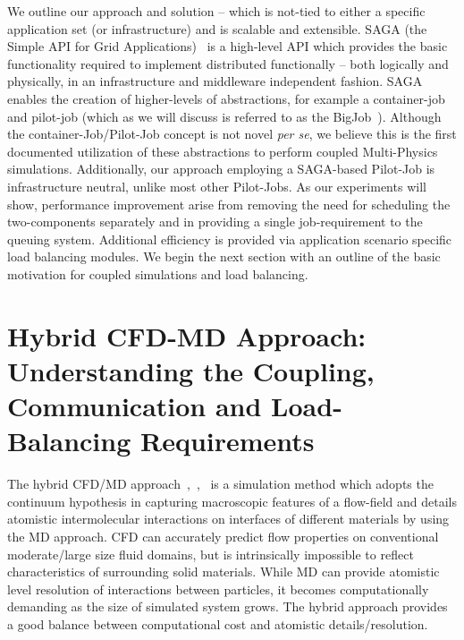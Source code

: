 \documentclass[conference,final]{IEEEtran}
\begin{document}
We outline our approach and solution -- which is not-tied to either a specific application set (or infrastructure) and is scalable and extensible. SAGA (the Simple API for Grid Applications)~\cite{saga_web} is a high-level API which provides the basic functionality required to implement distributed functionally -- both logically and physically, in an infrastructure and middleware independent fashion.  SAGA enables the creation of higher-levels of abstractions, for example a container-job and pilot-job (which as we will discuss is referred to as the BigJob~\cite{saga_royalsoc}). %
Although the container-Job/Pilot-Job concept is not novel {\it per se}, we believe this is the first documented utilization of these abstractions to perform coupled Multi-Physics simulations. Additionally, our approach employing a SAGA-based Pilot-Job is infrastructure neutral, unlike most other Pilot-Jobs.  As our experiments will show, performance improvement %
arise from removing the need for scheduling the two-components separately and in providing a single job-requirement to the queuing system. Additional efficiency is provided via application scenario specific load balancing modules.  We begin the next section with an outline of the basic motivation for coupled simulations and load balancing.


\section{Hybrid CFD-MD Approach: Understanding the Coupling, Communication and Load-Balancing Requirements}

The hybrid CFD/MD approach~\cite{Thompson},~\cite{Nie},~\cite{Yen} is a simulation method which adopts the continuum hypothesis in capturing macroscopic features of a flow-field and details atomistic intermolecular interactions on interfaces of different materials by using the MD approach.  CFD can accurately predict flow properties on conventional moderate/large size fluid domains, but is intrinsically impossible to reflect characteristics of surrounding solid materials. While MD can provide atomistic level resolution of interactions between particles, it becomes computationally demanding as the size of simulated system grows. The hybrid approach provides a good balance
between computational cost and atomistic details/resolution.
\end{document}
